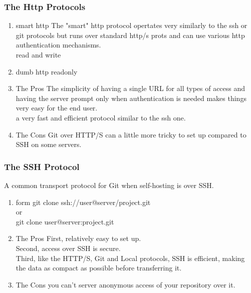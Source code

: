 \documentclass[11pt]{article}
\begin{document}
\subsubsection{The Http Protocols}
\label{sec:org356370a}
\begin{enumerate}
\item smart http
\label{sec:org06171a9}
The "smart" http protocol opertates very similarly to the ssh or git protocols but runs over standard http/s prots and can use various http authentication mechanisms.\\
read and write\\

\item dumb http
\label{sec:org0709fb6}
readonly\\

\item The Pros
\label{sec:orgce317dd}
The simplicity of having a single URL for all types of access and having the server prompt only when authentication is needed makes things very easy for the end user.\\

a very fast and efficient protocol similar to the ssh one.\\

\item The Cons
\label{sec:orgcbb7d2e}
Git over HTTP/S can a little more tricky to set up compared to SSH on some servers.\\
\end{enumerate}

\subsubsection{The SSH Protocol}
\label{sec:orgdffaf30}
A common transport protocol for Git when self-hosting is over SSH.\\
\begin{enumerate}
\item form
\label{sec:orgba742c7}
git clone ssh://user@server/project.git\\
or\\
git clone user@server:project.git\\

\item The Pros
\label{sec:org64d09a7}
First, relatively easy to set up.\\
Second, access over SSH is secure.\\
Third, like the HTTP/S, Git and Local protocols, SSH is efficient, making the data as compact as possible before transferring it.\\

\item The Cons
\label{sec:orgf8f6c2b}
you can't server anonymous access of your repository over it.\\
\end{enumerate}
\end{document}
